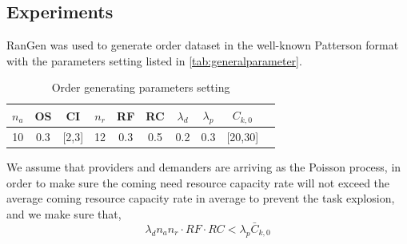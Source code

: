 
%     
%     
%     
%     
%     


\subsection{Experiments} %
\label{ssub:case_design}
RanGen \cite{Demeulemeester2003} was used to generate order dataset in the well-known Patterson format with the parameters setting listed in \autoref{tab:generalparameter}.
\begin{table}[htbp]
  \centering
  \scriptsize
  \caption{Order generating parameters setting}
    \begin{tabular}{cccccccccc}
    \toprule
    \textbf{$n_a$} & \textbf{OS} & \textbf{CI} & \textbf{$n_r$} & \textbf{RF} & \textbf{RC} & \textbf{$\lambda_d$} &\textbf{$\lambda_p$} & \textbf{$C_{k,0}$}\\
    \midrule
     10  &   0.3    &  [2,3]     &   12     &  0.3     &   0.5  & 0.2 & 0.3  & [20,30] \\
    \bottomrule
    \end{tabular}%
    {
    }
  \label{tab:generalparameter}%
\end{table}%
We assume that providers and demanders are arriving as the Poisson process, in order to make sure the coming need resource capacity rate will not exceed the average coming resource capacity rate in average to prevent the task explosion, and we make sure that,
\begin{equation}
\lambda_d n_a n_r \cdot RF \cdot RC < \lambda_p \bar C_{k,0} \label{eq:balance}
\end{equation}


